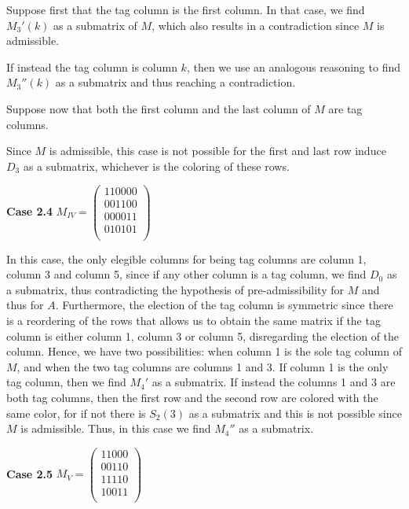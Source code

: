 \documentclass[a4paper,10pt]{report}
\theoremstyle{plain}
\theoremstyle{remark}
\theoremstyle{plain}
\begin{document}
{Suppose first that the tag column is the first column. In that case, we find $M_3'(k)$ as a submatrix of $M$, which also results in a contradiction since $M$ is admissible.

\vspace{1mm}
If instead the tag column is column $k$, then we use an analogous reasoning to find $M_3''(k)$ as a submatrix and thus reaching a contradiction.

\vspace{2mm}
Suppose now that both the first column and the last column of $M$ are tag columns.

Since $M$ is admissible, this case is not possible for the first and last row induce $D_3$ as a submatrix, whichever is the coloring of these rows.


\vspace{2mm}
\textbf{Case 2.4} $M_{IV}= \begin{pmatrix}
				110000\\
				001100\\
				000011\\
				010101\\
			\end{pmatrix}$

\vspace{2mm}

In this case, the only elegible columns for being tag columns are column 1, column 3 and column 5, since if any other column is a tag column, we find $D_0$ as a submatrix, thus contradicting the hypothesis of pre-admissibility for $M$ and thus for $A$. 
Furthermore, the election of the tag column is symmetric since there is a reordering of the rows that allows us to obtain the same matrix if the tag column is either column 1, column 3 or column 5, disregarding the election of the column. 
Hence, we have two possibilities: when column 1 is the sole tag column of $M$, and when the two tag columns are columns 1 and 3.
If column 1 is the only tag column, then we find $M_4'$ as a submatrix.
If instead the columns 1 and 3 are both tag columns, then the first row and the second row are colored with the same color, for if not there is $S_2(3)$ as a submatrix and this is not possible since $M$ is admissible. Thus, in this case we find $M_4''$ as a submatrix. 


\vspace{2mm}
\textbf{Case 2.5} $M_{V}= \begin{pmatrix}
				11000\\
				00110\\
				11110\\
				10011\\
			\end{pmatrix}$

}
\end{document}
